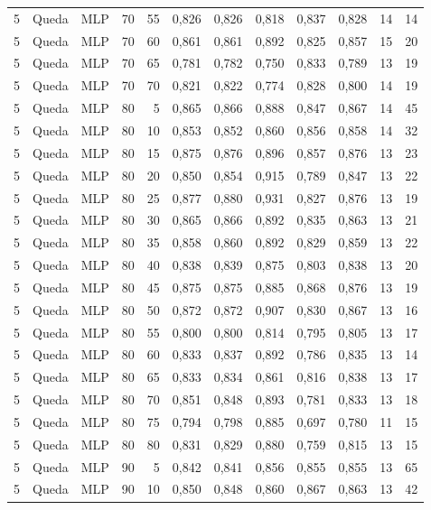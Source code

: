 \begin{longtable}{@{}rllrrrrrrrrr@{}}
5 & Queda & MLP & 70 & 55 & 0,826 & 0,826 & 0,818 & 0,837 & 0,828 & 14 & 14 \\
5 & Queda & MLP & 70 & 60 & 0,861 & 0,861 & 0,892 & 0,825 & 0,857 & 15 & 20 \\
5 & Queda & MLP & 70 & 65 & 0,781 & 0,782 & 0,750 & 0,833 & 0,789 & 13 & 19 \\
5 & Queda & MLP & 70 & 70 & 0,821 & 0,822 & 0,774 & 0,828 & 0,800 & 14 & 19 \\
5 & Queda & MLP & 80 & 5 & 0,865 & 0,866 & 0,888 & 0,847 & 0,867 & 14 & 45 \\
5 & Queda & MLP & 80 & 10 & 0,853 & 0,852 & 0,860 & 0,856 & 0,858 & 14 & 32 \\
5 & Queda & MLP & 80 & 15 & 0,875 & 0,876 & 0,896 & 0,857 & 0,876 & 13 & 23 \\
5 & Queda & MLP & 80 & 20 & 0,850 & 0,854 & 0,915 & 0,789 & 0,847 & 13 & 22 \\
5 & Queda & MLP & 80 & 25 & 0,877 & 0,880 & 0,931 & 0,827 & 0,876 & 13 & 19 \\
5 & Queda & MLP & 80 & 30 & 0,865 & 0,866 & 0,892 & 0,835 & 0,863 & 13 & 21 \\
5 & Queda & MLP & 80 & 35 & 0,858 & 0,860 & 0,892 & 0,829 & 0,859 & 13 & 22 \\
5 & Queda & MLP & 80 & 40 & 0,838 & 0,839 & 0,875 & 0,803 & 0,838 & 13 & 20 \\
5 & Queda & MLP & 80 & 45 & 0,875 & 0,875 & 0,885 & 0,868 & 0,876 & 13 & 19 \\
5 & Queda & MLP & 80 & 50 & 0,872 & 0,872 & 0,907 & 0,830 & 0,867 & 13 & 16 \\
5 & Queda & MLP & 80 & 55 & 0,800 & 0,800 & 0,814 & 0,795 & 0,805 & 13 & 17 \\
5 & Queda & MLP & 80 & 60 & 0,833 & 0,837 & 0,892 & 0,786 & 0,835 & 13 & 14 \\
5 & Queda & MLP & 80 & 65 & 0,833 & 0,834 & 0,861 & 0,816 & 0,838 & 13 & 17 \\
5 & Queda & MLP & 80 & 70 & 0,851 & 0,848 & 0,893 & 0,781 & 0,833 & 13 & 18 \\
5 & Queda & MLP & 80 & 75 & 0,794 & 0,798 & 0,885 & 0,697 & 0,780 & 11 & 15 \\
5 & Queda & MLP & 80 & 80 & 0,831 & 0,829 & 0,880 & 0,759 & 0,815 & 13 & 15 \\
5 & Queda & MLP & 90 & 5 & 0,842 & 0,841 & 0,856 & 0,855 & 0,855 & 13 & 65 \\
5 & Queda & MLP & 90 & 10 & 0,850 & 0,848 & 0,860 & 0,867 & 0,863 & 13 & 42 \\

\end{longtable}
